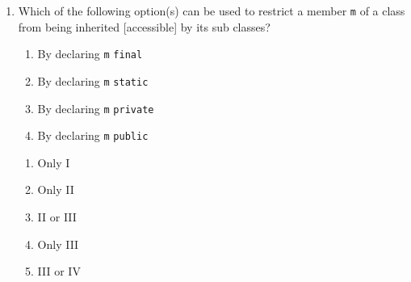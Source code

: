 \documentclass[CS180-S16-FinalExam.tex]{subfiles}
\begin{document}
\begin{enumerate}

\clearpage
\item Which of the following option(s) can be used to restrict a member \texttt{m} of a class from being inherited [accessible] by its sub classes?
\begin{enumerate}[I]
\item By declaring \texttt{m} \texttt{final}
\item By declaring \texttt{m} \texttt{static}
\item By declaring \texttt{m} \texttt{private}
\item By declaring \texttt{m} \texttt{public}
\end{enumerate}
\begin{enumerate}
\item Only I
\item Only II
\item II or III
\item Only III \ifdraft \Ans \fi
\item III or IV 
\end{enumerate}


\end{enumerate}
\end{document}

